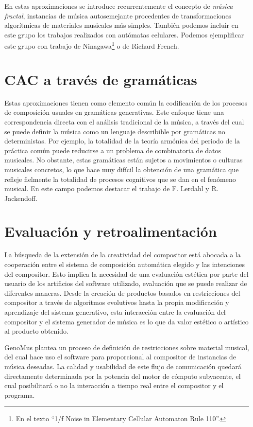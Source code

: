 En estas aproximaciones se introduce recurrentemente el concepto de \textit{música fractal}, instancias de música autosemejante procedentes de transformaciones algorítmicas de materiales musicales más simples. También podemos incluir en este grupo los trabajos realizados con autómatas celulares. Podemos ejemplificar este grupo con trabajo de Ninagawa\footnote{En el texto ``1/f Noise in Elementary Cellular Automaton Rule 110''\cite{Ninagawa}.} o de Richard French\cite{automata-repr}.

\section{CAC a través de gramáticas}

Estas aproximaciones tienen como elemento común la codificación de los procesos de composición usuales en gramáticas generativas. Este enfoque tiene una correspondencia directa con el análisis tradicional de la música, a través del cual se puede definir la música como un lenguaje describible por gramáticas no deterministas. Por ejemplo, la totalidad de la teoría armónica del periodo de la práctica común puede reducirse a un problema de combinatoria de datos musicales. No obstante, estas gramáticas están sujetos a movimientos o culturas musicales concretos, lo que hace muy difícil la obtención de una gramática que refleje fielmente la totalidad de procesos cognitivos que se dan en el fenómeno musical. En este campo podemos destacar el trabajo de F. Lerdahl y R. Jackendoff\cite{generative-theory}.

\section{Evaluación y retroalimentación}

La búsqueda de la extensión de la creatividad del compositor está abocada a la cooperación entre el sistema de composición automática elegido y las intenciones del compositor. Esto implica la necesidad de una evaluación estética por parte del usuario de los artificios del software utilizado, evaluación que se puede realizar de diferentes maneras. Desde la creación de productos basados en restricciones del compositor a través de algoritmos evolutivos hasta la propia modificación y aprendizaje del sistema generativo, esta interacción entre la evaluación del compositor y el sistema generador de música es lo que da valor estético o artístico al producto obtenido.

GenoMus plantea un proceso de definición de restricciones sobre material musical, del cual hace uso el software para proporcional al compositor de instancias de música deseadas\cite{GenoMus-master}. La calidad y usabilidad de este flujo de comunicación quedará directamente determinada por la potencia del motor de cómputo subyacente, el cual posibilitará o no la interacción a tiempo real entre el compositor y el programa.



